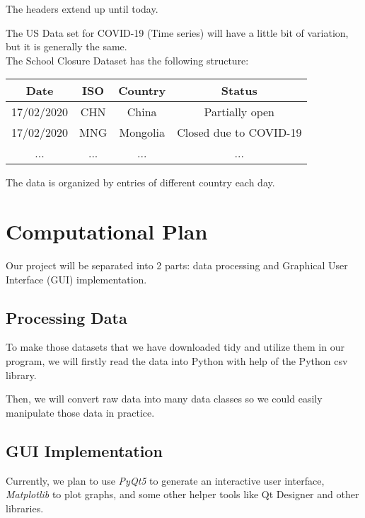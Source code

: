\documentclass[fontsize=11pt]{article}
\begin{document}
The headers extend up until today.

The US Data set for COVID-19 (Time series) will have a little bit of variation, but it is generally the same.\\

The School Closure Dataset has the following structure:
\begin{center}
    \begin{tabular}{ |c|c|c|c| }
        \hline
        Date & ISO & Country & Status \\
        \hline
        17/02/2020 & CHN & China & Partially open \\
        \hline
        17/02/2020 & MNG & Mongolia & Closed due to COVID-19 \\
        \hline
        ... & ... & ... & ...\\
        \hline
    \end{tabular}
\end{center}

The data is organized by entries of different country each day.

\newpage


\section*{Computational Plan}

Our project will be separated into 2 parts: data processing and Graphical User Interface (GUI) implementation.

\subsection*{Processing Data}

To make those datasets that we have downloaded tidy and utilize them in our program, we will firstly read the data into Python with help of the Python csv library.

Then, we will convert raw data into many data classes so we could easily manipulate those data in practice.

\subsection*{GUI Implementation}

Currently, we plan to use \emph{PyQt5} to generate an interactive user interface, \emph{Matplotlib} to plot graphs, and some other helper tools like Qt Designer and other libraries.
\end{document}
